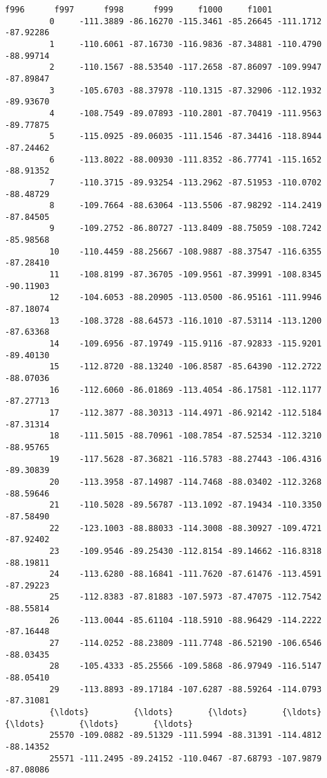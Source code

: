 \documentclass[11pt]{article}
\begin{document}
\begin{Verbatim}[commandchars=\\\{\}]
                    f996      f997      f998      f999     f1000     f1001  
         0     -111.3889 -86.16270 -115.3461 -85.26645 -111.1712 -87.92286  
         1     -110.6061 -87.16730 -116.9836 -87.34881 -110.4790 -88.99714  
         2     -110.1567 -88.53540 -117.2658 -87.86097 -109.9947 -87.89847  
         3     -105.6703 -88.37978 -110.1315 -87.32906 -112.1932 -89.93670  
         4     -108.7549 -89.07893 -110.2801 -87.70419 -111.9563 -89.77875  
         5     -115.0925 -89.06035 -111.1546 -87.34416 -118.8944 -87.24462  
         6     -113.8022 -88.00930 -111.8352 -86.77741 -115.1652 -88.91352  
         7     -110.3715 -89.93254 -113.2962 -87.51953 -110.0702 -88.48729  
         8     -109.7664 -88.63064 -113.5506 -87.98292 -114.2419 -87.84505  
         9     -109.2752 -86.80727 -113.8409 -88.75059 -108.7242 -85.98568  
         10    -110.4459 -88.25667 -108.9887 -88.37547 -116.6355 -87.28410  
         11    -108.8199 -87.36705 -109.9561 -87.39991 -108.8345 -90.11903  
         12    -104.6053 -88.20905 -113.0500 -86.95161 -111.9946 -87.18074  
         13    -108.3728 -88.64573 -116.1010 -87.53114 -113.1200 -87.63368  
         14    -109.6956 -87.19749 -115.9116 -87.92833 -115.9201 -89.40130  
         15    -112.8720 -88.13240 -106.8587 -85.64390 -112.2722 -88.07036  
         16    -112.6060 -86.01869 -113.4054 -86.17581 -112.1177 -87.27713  
         17    -112.3877 -88.30313 -114.4971 -86.92142 -112.5184 -87.31314  
         18    -111.5015 -88.70961 -108.7854 -87.52534 -112.3210 -88.95765  
         19    -117.5628 -87.36821 -116.5783 -88.27443 -106.4316 -89.30839  
         20    -113.3958 -87.14987 -114.7468 -88.03402 -112.3268 -88.59646  
         21    -110.5028 -89.56787 -113.1092 -87.19434 -110.3350 -87.58490  
         22    -123.1003 -88.88033 -114.3008 -88.30927 -109.4721 -87.92402  
         23    -109.9546 -89.25430 -112.8154 -89.14662 -116.8318 -88.19811  
         24    -113.6280 -88.16841 -111.7620 -87.61476 -113.4591 -87.29223  
         25    -112.8383 -87.81883 -107.5973 -87.47075 -112.7542 -88.55814  
         26    -113.0044 -85.61104 -118.5910 -88.96429 -114.2222 -87.16448  
         27    -114.0252 -88.23809 -111.7748 -86.52190 -106.6546 -88.03435  
         28    -105.4333 -85.25566 -109.5868 -86.97949 -116.5147 -88.05410  
         29    -113.8893 -89.17184 -107.6287 -88.59264 -114.0793 -87.31081  
         {\ldots}         {\ldots}       {\ldots}       {\ldots}       {\ldots}       {\ldots}       {\ldots}  
         25570 -109.0882 -89.51329 -111.5994 -88.31391 -114.4812 -88.14352  
         25571 -111.2495 -89.24152 -110.0467 -87.68793 -107.9879 -87.08086  

\end{Verbatim}
\end{document}
